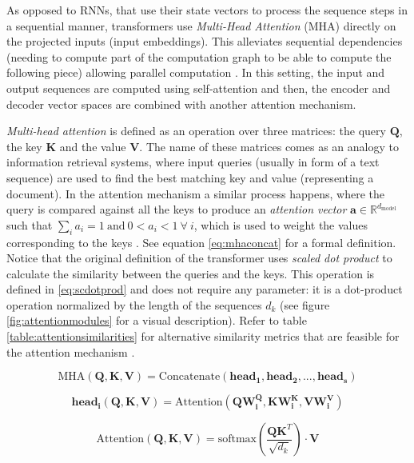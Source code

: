 As opposed to RNNs, that use their state vectors to process the sequence steps in a sequential manner, transformers use \textit{Multi-Head Attention} (MHA) directly on the projected inputs (input embeddings). This alleviates sequential dependencies (needing to compute part of the computation graph to be able to compute the following piece) allowing parallel computation \cite{uday2019}. In this setting, the input and output sequences are computed using self-attention and then, the encoder and decoder vector spaces are combined with another attention mechanism.

 \textit{Multi-head attention} is defined as an operation over three matrices: the query $\mathbf{Q}$, the key $\mathbf{K}$ and the value $\mathbf{V}$. The name of these matrices comes as an analogy to information retrieval systems, where input queries (usually in form of a text sequence) are used to find the best matching key and value (representing a document). In the attention mechanism a similar process happens, where the query is compared against all the keys to produce an \textit{attention vector} $\mathbf{a} \in \mathbb{R}^{d_{\mathrm{model}}}$ such that $\sum_{i} a_i = 1\ \mathrm{and}\ 0<a_i<1\ \forall\ i$, which is used to weight the values corresponding to the keys \cite{vaswani2017}. See equation \ref{eq:mhaconcat} for a formal definition. Notice that the original definition of the transformer \cite{vaswani2017} uses \textit{scaled dot product}  to calculate the similarity between the queries and the keys. This operation is defined in \ref{eq:scdotprod} and does not require any parameter: it is a dot-product operation normalized by the length of the sequences $d_k$ (see figure \ref{fig:attentionmodules} for a visual description). Refer to table \ref{table:attentionsimilarities} for alternative similarity metrics that are feasible for the attention mechanism \cite{uday2019}.
 
 \begin{equation}
 \label{eq:mhaconcat}
 \mathrm{MHA}(\mathbf{Q, K, V}) = \mathrm{Concatenate}(\mathrm{\mathbf{head_1}},\mathrm{\mathbf{head_2}},...,\mathrm{\mathbf{head_s}})
 \end{equation}
 
 
 \begin{equation}
 \label{eq:headsdef}
 \mathrm{\mathbf{head_i}}(\mathbf{Q,K,V}) = \mathrm{Attention}(\mathbf{Q} \mathbf{W^Q_i}, \mathbf{K} \mathbf{W^K_i}, \mathbf{V} \mathbf{W^V_i})
 \end{equation}
 
 \begin{equation}
 \label{eq:scdotprod}
 \mathrm{Attention}(\mathbf{Q, K, V}) = \mathrm{softmax} \left(\frac{\mathbf{QK}^T}{\sqrt{d_k}}\right) \cdot \mathbf{V}
 \end{equation}
 
